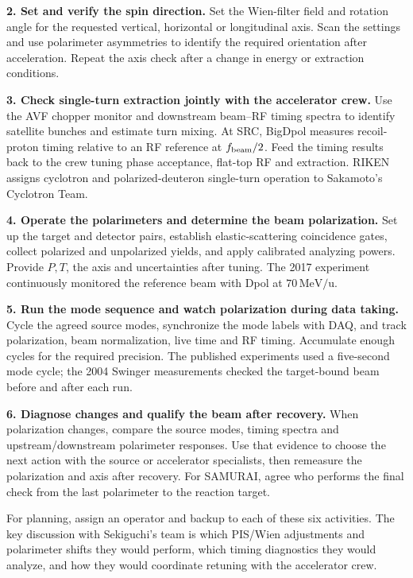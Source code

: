 \documentclass[11pt,a4paper]{article}
\newcommand{\src}[2]{~\cite[#2]{#1}}
\newcommand{\unit}[1]{\,\mathrm{#1}}
\begin{document}
\textbf{2. Set and verify the spin direction.}
Set the Wien-filter field and rotation angle for the requested vertical, horizontal or longitudinal axis. Scan the settings and use polarimeter asymmetries to identify the required orientation after acceleration. Repeat the axis check after a change in energy or extraction conditions.\src{Sakamoto2016}{PDF p. 2, Fig. 3}\src{Sekiguchi2017}{PDF p. 4, Sec. II}

\textbf{3. Check single-turn extraction jointly with the accelerator crew.}
Use the AVF chopper monitor and downstream beam--RF timing spectra to identify satellite bunches and estimate turn mixing. At SRC, BigDpol measures recoil-proton timing relative to an RF reference at $f_{\rm beam}/2$. Feed the timing results back to the crew tuning phase acceptance, flat-top RF and extraction. RIKEN assigns cyclotron and polarized-deuteron single-turn operation to Sakamoto's Cyclotron Team.\src{Sakamoto2016}{PDF p. 3, Figs. 4--6}\src{CyclotronTeam}{Research Summary, items 2, 3 and 6}

\textbf{4. Operate the polarimeters and determine the beam polarization.}
Set up the target and detector pairs, establish elastic-scattering coincidence gates, collect polarized and unpolarized yields, and apply calibrated analyzing powers. Provide $P,T$, the axis and uncertainties after tuning. The 2017 experiment continuously monitored the reference beam with Dpol at $70\unit{MeV/u}$.\src{Sekiguchi2017}{PDF pp. 3--4, Sec. II}

\textbf{5. Run the mode sequence and watch polarization during data taking.}
Cycle the agreed source modes, synchronize the mode labels with DAQ, and track polarization, beam normalization, live time and RF timing. Accumulate enough cycles for the required precision. The published experiments used a five-second mode cycle; the 2004 Swinger measurements checked the target-bound beam before and after each run.\src{Sekiguchi2017}{PDF p. 4}\src{Sekiguchi2004}{arXiv PDF pp. 5--6}

\textbf{6. Diagnose changes and qualify the beam after recovery.}
When polarization changes, compare the source modes, timing spectra and upstream/downstream polarimeter responses. Use that evidence to choose the next action with the source or accelerator specialists, then remeasure the polarization and axis after recovery. For SAMURAI, agree who performs the final check from the last polarimeter to the reaction target.

For planning, assign an operator and backup to each of these six activities. The key discussion with Sekiguchi's team is which PIS/Wien adjustments and polarimeter shifts they would perform, which timing diagnostics they would analyze, and how they would coordinate retuning with the accelerator crew.
\end{document}
